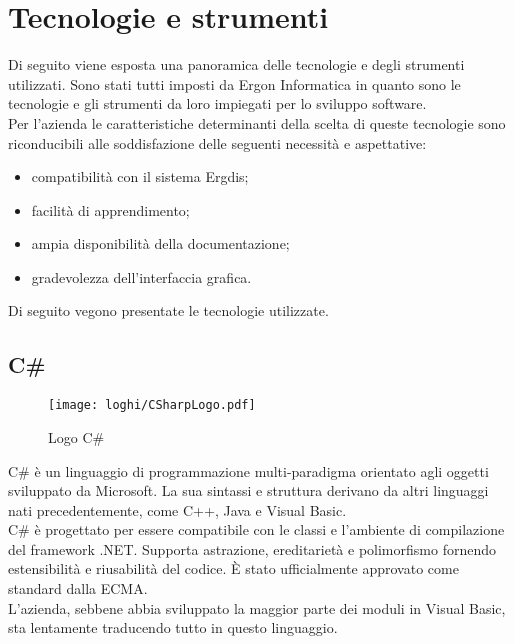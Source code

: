 \newpage

\section{Tecnologie e strumenti}
\label{sec:tecnologie-strumenti}

\noindent Di seguito viene esposta una panoramica delle tecnologie e degli strumenti utilizzati.
Sono stati tutti imposti da Ergon Informatica in quanto sono le tecnologie e gli strumenti
da loro impiegati per lo sviluppo software.\\
Per l’azienda le caratteristiche determinanti della scelta di queste tecnologie
sono riconducibili alle soddisfazione delle seguenti necessità e aspettative:
\begin{itemize}
    \item compatibilità con il sistema Ergdis;
    \item facilità di apprendimento;
    \item ampia disponibilità della documentazione;
    \item gradevolezza dell’interfaccia grafica.
\end{itemize}
Di seguito vegono presentate le tecnologie utilizzate.


\subsection*{C\#}
\begin{figure}[!h] 
    \centering 
    \texttt{[image: loghi/CSharpLogo.pdf]} 
    \caption{Logo C\#}
 \end{figure}
\noindent C\# è un linguaggio di programmazione multi-paradigma orientato agli oggetti
sviluppato da Microsoft. La sua sintassi e struttura derivano da altri linguaggi nati
precedentemente, come C++, Java e Visual Basic.\\
C\# è progettato per essere compatibile con le classi e l’ambiente di compilazione
del framework .NET. Supporta astrazione, ereditarietà e polimorfismo
fornendo estensibilità e riusabilità del codice.
È stato ufficialmente approvato come standard dalla ECMA.\\
L'azienda, sebbene abbia sviluppato la maggior parte dei moduli
in Visual Basic, sta lentamente traducendo tutto in questo linguaggio.

